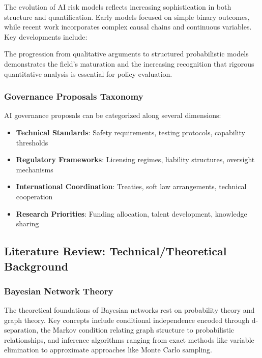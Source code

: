 \documentclass[
  11pt,
  letterpaper,
]{book}
\providecommand{\tightlist}{%
  \setlength{\itemsep}{0pt}\setlength{\parskip}{0pt}}
\begin{document}
The evolution of AI risk models reflects increasing sophistication in
both structure and quantification. Early models focused on simple binary
outcomes, while recent work incorporates complex causal chains and
continuous variables. Key developments include:

The progression from qualitative arguments to structured probabilistic
models demonstrates the field's maturation and the increasing
recognition that rigorous quantitative analysis is essential for policy
evaluation.

\subsubsection{Governance Proposals
Taxonomy}\label{sec-governance-taxonomy}

AI governance proposals can be categorized along several dimensions:

\begin{itemize}
\tightlist
\item
  \textbf{Technical Standards}: Safety requirements, testing protocols,
  capability thresholds
\item
  \textbf{Regulatory Frameworks}: Licensing regimes, liability
  structures, oversight mechanisms
\item
  \textbf{International Coordination}: Treaties, soft law arrangements,
  technical cooperation
\item
  \textbf{Research Priorities}: Funding allocation, talent development,
  knowledge sharing
\end{itemize}

\subsection{Literature Review: Technical/Theoretical
Background}\label{sec-technical-literature}

\subsubsection{Bayesian Network Theory}\label{sec-bn-theory}

The theoretical foundations of Bayesian networks rest on probability
theory and graph theory. Key concepts include conditional independence
encoded through d-separation, the Markov condition relating graph
structure to probabilistic relationships, and inference algorithms
ranging from exact methods like variable elimination to approximate
approaches like Monte Carlo sampling.
\end{document}
